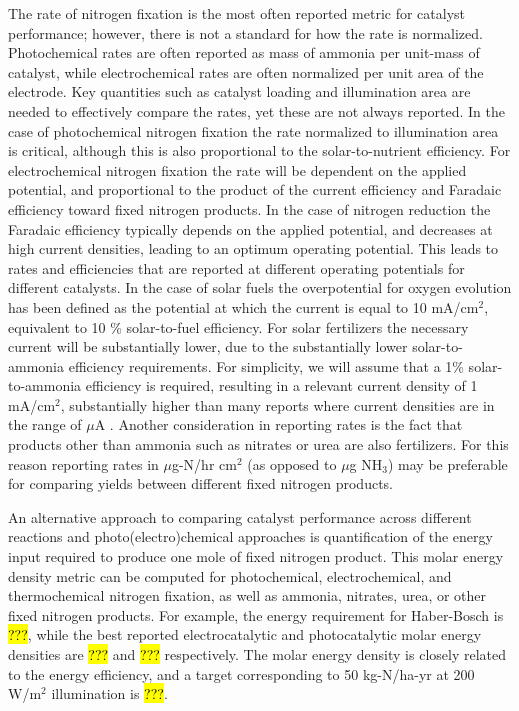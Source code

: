 The rate of nitrogen fixation is the most often reported metric for catalyst performance; however, there is not a standard for how the rate is normalized. Photochemical rates are often reported as mass of ammonia per unit-mass of catalyst, while electrochemical rates are often normalized per unit area of the electrode. Key quantities such as catalyst loading and illumination area are needed to effectively compare the rates, yet these are not always reported. In the case of photochemical nitrogen fixation the rate normalized to illumination area is critical, although this is also proportional to the solar-to-nutrient efficiency. For electrochemical nitrogen fixation the rate will be dependent on the applied potential, and proportional to the product of the current efficiency and Faradaic efficiency toward fixed nitrogen products. In the case of nitrogen reduction the Faradaic efficiency typically depends on the applied potential, and decreases at high current densities, leading to an optimum operating potential. This leads to rates and efficiencies that are reported at different operating potentials for different catalysts. In the case of solar fuels the overpotential for oxygen evolution has been defined as the potential at which the current is equal to 10 mA/cm$^2$, equivalent to 10 \% solar-to-fuel efficiency. For solar fertilizers the necessary current will be substantially lower, due to the substantially lower solar-to-ammonia efficiency requirements. For simplicity, we will assume that a 1\% solar-to-ammonia efficiency is required, resulting in a relevant current density of 1 mA/cm$^2$, substantially higher than many reports where current densities are in the range of $\mu$A \needcite. Another consideration in reporting rates is the fact that products other than ammonia such as nitrates or urea are also fertilizers. For this reason reporting rates in $\mu$g-N/hr cm$^2$ (as opposed to $\mu$g NH$_3$) may be preferable for comparing yields between different fixed nitrogen products.

An alternative approach to comparing catalyst performance across different reactions and photo(electro)chemical approaches is quantification of the energy input required to produce one mole of fixed nitrogen product. This molar energy density metric can be computed for photochemical, electrochemical, and thermochemical nitrogen fixation, as well as ammonia, nitrates, urea, or other fixed nitrogen products. For example, the energy requirement for Haber-Bosch is \hl{???}, while the best reported electrocatalytic and photocatalytic molar energy densities are  \hl{???} and \hl{???} respectively. The molar energy density is closely related to the energy efficiency, and a target corresponding to 50 kg-N/ha-yr at 200 W/m$^2$ illumination is \hl{???}.

